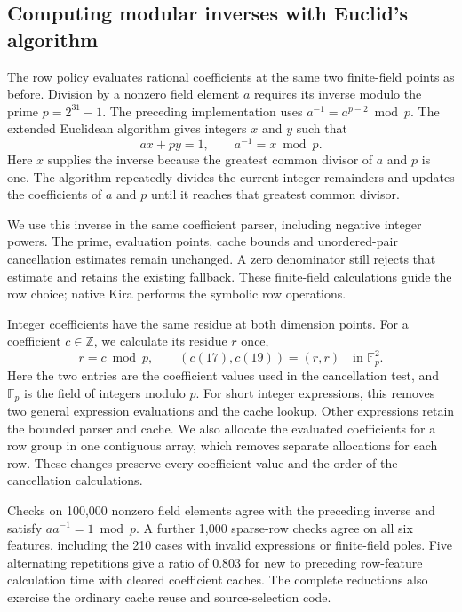 \subsection{Computing modular inverses with Euclid's algorithm}
The row policy evaluates rational coefficients at the same two finite-field
points as before. Division by a nonzero field element $a$ requires its
inverse modulo the prime $p=2^{31}-1$. The preceding implementation uses
$a^{-1}=a^{p-2}\bmod p$. The extended Euclidean algorithm gives integers
$x$ and $y$ such that
\[
 ax+py=1,\qquad a^{-1}=x\bmod p .
\]
Here $x$ supplies the inverse because the greatest common divisor of $a$
and $p$ is one. The algorithm repeatedly divides the current integer
remainders and updates the coefficients of $a$ and $p$ until it reaches
that greatest common divisor.

We use this inverse in the same coefficient parser, including negative
integer powers. The prime, evaluation points, cache bounds and
unordered-pair cancellation estimates remain unchanged. A zero denominator
still rejects that estimate and retains the existing fallback. These
finite-field calculations guide the row choice; native Kira performs
the symbolic row operations.

\begin{samepage}
Integer coefficients have the same residue at both dimension points.
For a coefficient $c\in\mathbb Z$, we calculate its residue $r$ once,
\[
 r=c\bmod p,\qquad (c(17),c(19))=(r,r)\quad\text{in }\mathbb F_p^2.
\]
Here the two entries are the coefficient values used in the cancellation
test, and $\mathbb F_p$ is the field of integers modulo $p$. For short
integer expressions, this removes two general expression evaluations and
the cache lookup. Other expressions retain the bounded parser and cache.
We also allocate the evaluated coefficients for a row group in one
contiguous array, which removes separate allocations for each row.
These changes preserve every coefficient value and the order of the
cancellation calculations.
\par\end{samepage}

Checks on 100,000 nonzero field elements agree with the preceding inverse
and satisfy $aa^{-1}=1\bmod p$. A further 1,000 sparse-row checks agree
on all six features, including the 210 cases with invalid expressions or
finite-field poles. Five alternating repetitions give a ratio of 0.803 for new to preceding row-feature calculation
time with cleared coefficient caches. The complete reductions also exercise
the ordinary cache reuse and source-selection code.

